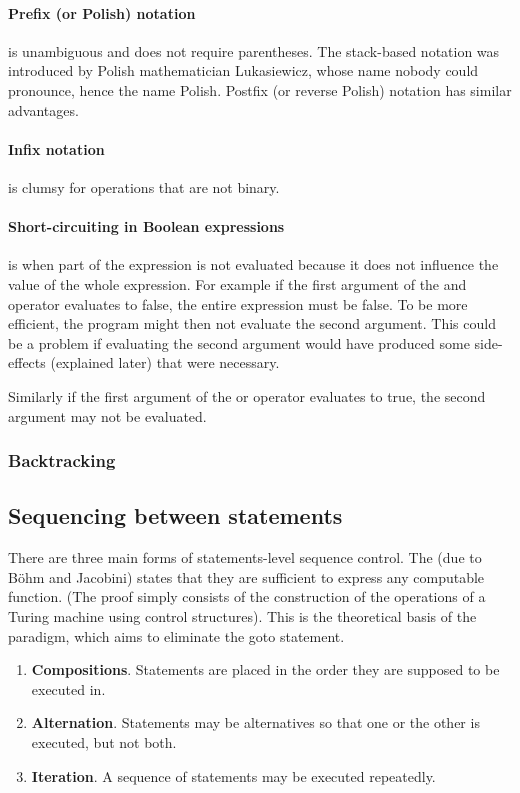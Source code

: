 \paragraph{Prefix (or Polish) notation} is unambiguous and does not require parentheses. The stack-based notation was introduced by Polish mathematician Lukasiewicz, whose name nobody could pronounce, hence the name Polish. Postfix (or reverse Polish) notation has similar advantages.
\paragraph{Infix notation} is clumsy for operations that are not binary.
\paragraph{Short-circuiting in Boolean expressions} is when part of the expression is not evaluated because it does not influence the value of the whole expression. For example if the first argument of the and operator evaluates to false, the entire expression must be false. To be more efficient, the program might then not evaluate the second argument. This could be a problem if evaluating the second argument would have produced some side-effects (explained later) that were necessary.

Similarly if the first argument of the or operator evaluates to true, the second argument may not be evaluated.

\subsubsection{Backtracking}

\subsection{Sequencing between statements}
There are three main forms of statements-level sequence control. The  (due to Böhm and Jacobini) states that they are sufficient to express any computable function. (The proof simply consists of the construction of the operations of a Turing machine using control structures). This is the theoretical basis of the  paradigm, which aims to eliminate the goto statement.
\begin{enumerate}
\item \textbf{Compositions}. Statements are placed in the order they are supposed to be executed in.
\item \textbf{Alternation}. Statements may be alternatives so that one or the other is executed, but not both.
\item \textbf{Iteration}. A sequence of statements may be executed repeatedly.
\end{enumerate}

